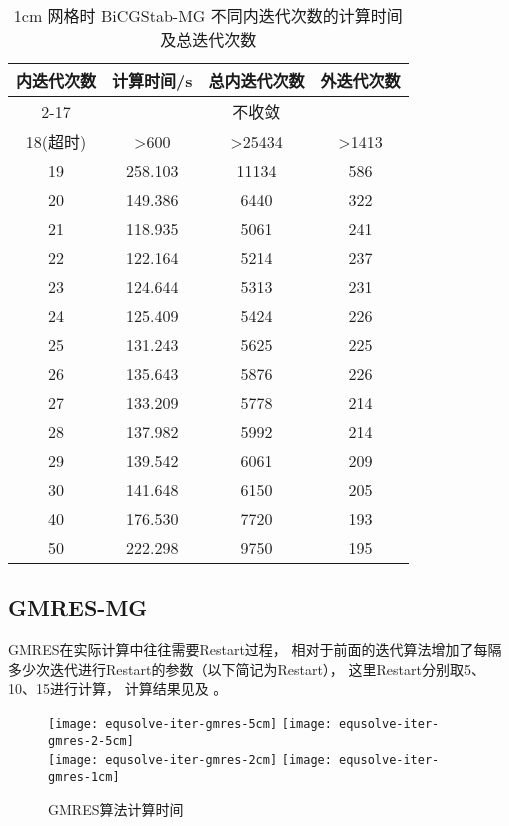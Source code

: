 \begin{datasheet}
\begin{table}
\centering
\caption{1cm 网格时 BiCGStab-MG 不同内迭代次数的计算时间及总迭代次数}
\label{tab:equsolve.iter.bicgstab-mg.1cm}
\begin{tabular}{cccc}
\toprule
内迭代次数 & 计算时间/s & 总内迭代次数 & 外迭代次数\\
\midrule
2-17 & \multicolumn{3}{c}{不收敛} \\ %
18(超时) & >600 & >25434 & >1413 \\ %
19 & 258.103 & 11134 & 586\\
20 & 149.386 & 6440 & 322\\
21 & 118.935 & 5061 & 241\\
22 & 122.164 & 5214 & 237\\
23 & 124.644 & 5313 & 231\\
24 & 125.409 & 5424 & 226\\
25 & 131.243 & 5625 & 225\\
26 & 135.643 & 5876 & 226\\
27 & 133.209 & 5778 & 214\\
28 & 137.982 & 5992 & 214\\
29 & 139.542 & 6061 & 209\\
30 & 141.648 & 6150 & 205\\
40 & 176.530 & 7720 & 193\\
50 & 222.298 & 9750 & 195\\
\bottomrule
\end{tabular}
\end{table}

\end{datasheet}

\subsection{GMRES-MG}
GMRES在实际计算中往往需要Restart过程，
相对于前面的迭代算法增加了每隔多少次迭代进行Restart的参数（以下简记为Restart），
这里Restart分别取5、10、15进行计算，
计算结果见及
。

\begin{figure}
\centering
{}
{\texttt{[image: equsolve-iter-gmres-5cm]}}
{\texttt{[image: equsolve-iter-gmres-2-5cm]}}
\\[1cm]
{\texttt{[image: equsolve-iter-gmres-2cm]}}
{\texttt{[image: equsolve-iter-gmres-1cm]}}
\caption{\label{fig:fig:equsolve.iter.gmres}GMRES算法计算时间}
\end{figure}

